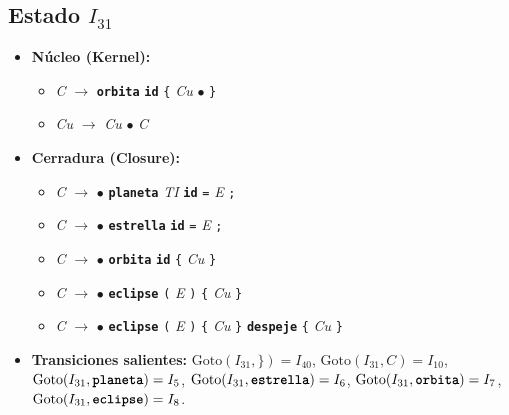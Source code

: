 \documentclass[12pt, letterpaper]{article}
\begin{document}
\subsection*{Estado $I_{31}$ }
\begin{itemize}\setlength{\itemsep}{1pt}\setlength{\parskip}{0pt}
\item \textbf{Núcleo (Kernel):}
\begin{itemize}\setlength{\itemsep}{1pt}\setlength{\parskip}{0pt}
    \item \textit{C} $\to$ \textbf{\texttt{orbita}} \textbf{\texttt{id}} \texttt{\{} \textit{Cu} $\bullet$ \texttt{\}}
    \item \textit{Cu} $\to$ \textit{Cu} $\bullet$ \textit{C}
\end{itemize}
\item \textbf{Cerradura (Closure):}
\begin{itemize}\setlength{\itemsep}{1pt}\setlength{\parskip}{0pt}
    \item \textit{C} $\to$ $\bullet$ \textbf{\texttt{planeta}} \textit{TI} \textbf{\texttt{id}} \texttt{=} \textit{E} \texttt{;}
    \item \textit{C} $\to$ $\bullet$ \textbf{\texttt{estrella}} \textbf{\texttt{id}} \texttt{=} \textit{E} \texttt{;}
    \item \textit{C} $\to$ $\bullet$ \textbf{\texttt{orbita}} \textbf{\texttt{id}} \texttt{\{} \textit{Cu} \texttt{\}}
    \item \textit{C} $\to$ $\bullet$ \textbf{\texttt{eclipse}} \texttt{(} \textit{E} \texttt{)} \texttt{\{} \textit{Cu} \texttt{\}}
    \item \textit{C} $\to$ $\bullet$ \textbf{\texttt{eclipse}} \texttt{(} \textit{E} \texttt{)} \texttt{\{} \textit{Cu} \texttt{\}} \textbf{\texttt{despeje}} \texttt{\{} \textit{Cu} \texttt{\}}
\end{itemize}
\item \textbf{Transiciones salientes:} $\text{Goto}(I_{31}, \texttt{\}}) = I_{40}$, \quad $\text{Goto}(I_{31}, \textit{C}) = I_{10}$, \quad $\text{Goto}(I_{31}, \textbf{\texttt{planeta}}) = I_{5}$, \quad $\text{Goto}(I_{31}, \textbf{\texttt{estrella}}) = I_{6}$, \quad $\text{Goto}(I_{31}, \textbf{\texttt{orbita}}) = I_{7}$, \quad $\text{Goto}(I_{31}, \textbf{\texttt{eclipse}}) = I_{8}$.
\end{itemize}
\vspace{2pt}
\end{document}
